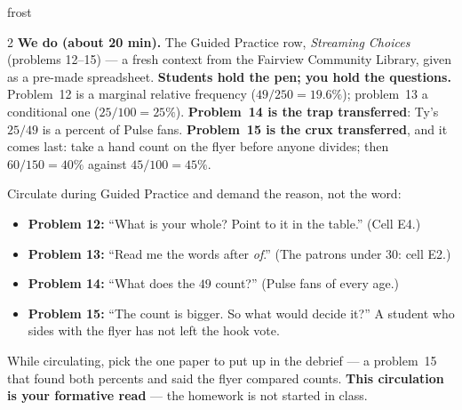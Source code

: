 \documentclass[10pt]{article}
\begin{document}
\begin{skillbox}{frost}
\begin{multicols}{2}
\columnbreak
\textbf{We do (about 20 min).} The Guided Practice row, \emph{Streaming Choices} (problems
12--15) --- a fresh context from the Fairview Community Library, given as a pre-made spreadsheet.
\textbf{Students hold the pen; you hold the questions.} Problem~12 is a marginal relative
frequency ($49/250 = 19.6\%$); problem~13 a conditional one ($25/100 = 25\%$). \textbf{Problem~14
is the trap transferred}: Ty's $25/49$ is a percent of Pulse fans. \textbf{Problem~15 is the crux
transferred}, and it comes last: take a hand count on the flyer before anyone divides; then
$60/150 = 40\%$ against $45/100 = 45\%$.

Circulate during Guided Practice and demand the reason, not the word:
\begin{itemize}[leftmargin=1.1em, nosep]
  \item \textbf{Problem 12:} ``What is your whole? Point to it in the table.'' (Cell E4.)
  \item \textbf{Problem 13:} ``Read me the words after \emph{of}.'' (The patrons under $30$:
        cell E2.)
  \item \textbf{Problem 14:} ``What does the $49$ count?'' (Pulse fans of every age.)
  \item \textbf{Problem 15:} ``The count is bigger. So what would decide it?'' A student who
        sides with the flyer has not left the hook vote.
\end{itemize}
While circulating, pick the one paper to put up in the debrief --- a problem~15 that found both
percents and said the flyer compared counts. \textbf{This circulation is your formative read}
--- the homework is not started in class.
\end{multicols}
\end{skillbox}
\end{document}
